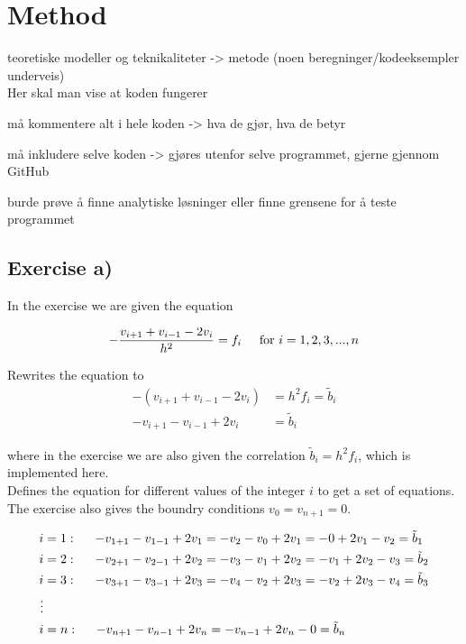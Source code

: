 \documentclass{article}
\begin{document}
\section{Method}

  teoretiske modeller og teknikaliteter -> metode (noen beregninger/kodeeksempler underveis) \\
  Her skal man vise at koden fungerer

  må kommentere alt i hele koden -> hva de gjør, hva de betyr

  må inkludere selve koden -> gjøres utenfor selve programmet, gjerne gjennom GitHub

  burde prøve å finne analytiske løsninger eller finne grensene for å teste programmet

  \subsection{Exercise a)}

    In the exercise we are given the equation

    \begin{equation*}
      - \frac{v_{i+1} + v_{i-1} - 2 v_i}{h^2} = f_i \hspace{5mm} \textrm{for} ~  i = 1, 2, 3, ... , n
    \end{equation*}

    Rewrites the equation to
    \begin{align*}
      - (v_{i+1} + v_{i-1} - 2 v_i) &= h^2 f_i = \tilde{b}_i \\
      - v_{i+1} - v_{i-1} + 2 v_i &= \tilde{b}_i
    \end{align*}

    where in the exercise we are also given the correlation $\tilde{b}_i = h^2 f_i$, which is implemented here. \\

    Defines the equation for different values of the integer $i$ to get a set of equations. The exercise also gives the boundry conditions $v_0 = v_{n+1} = 0$.

    \begin{align*}
      i &= 1 : \hspace{5mm} - v_{1+1} - v_{1-1} + 2 v_1 = - v_2 - v_0 + 2 v_1 = - 0 + 2 v_1 - v_2 = \tilde{b}_1 \\
      i &= 2 : \hspace{5mm} - v_{2+1} - v_{2-1} + 2 v_2 = - v_3 - v_1 + 2 v_2 = - v_1 + 2 v_2 - v_3 = \tilde{b}_2 \\
      i &= 3 : \hspace{5mm} - v_{3+1} - v_{3-1} + 2 v_3 = - v_4 - v_2 + 2 v_3 = - v_2 + 2 v_3 - v_4 = \tilde{b}_3 \\
      \vdots \\
      i &= n : \hspace{5mm} - v_{n+1} - v_{n-1} + 2 v_n = - v_{n-1} + 2 v_n - 0 = \tilde{b}_n \\
    \end{align*}
\end{document}
